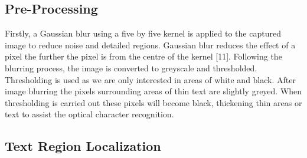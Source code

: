 \documentclass[12pt,a4paper,notitlepage]{IEEEtran}
\begin{document}
	\subsection{Pre-Processing}

Firstly, a Gaussian blur using a five by five kernel is applied to the captured image to reduce noise and detailed regions. Gaussian blur reduces the effect of a pixel the further the pixel is from the centre of the kernel [11]. 
Following the blurring process, the image is converted to greyscale and thresholded. Thresholding is used as we are only interested in areas of white and black. After image blurring the pixels surrounding areas of thin text are slightly greyed. When thresholding is carried out these pixels will become black, thickening thin areas or text to assist the optical character recognition.

	\subsection{Text Region Localization}



	
\end{document}
